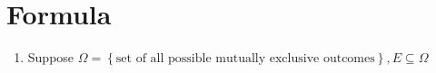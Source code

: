 \documentclass{article}
\begin{document}
\section*{Formula}

\begin{enumerate}

\item Suppose \(\Omega = \left \{  \text{set of all possible mutually exclusive outcomes} \right \}, E \subseteq \Omega \)

\end{enumerate}
\end{document}
